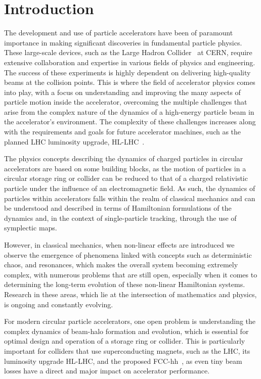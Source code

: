 


\chapter*{Introduction}

The development and use of particle accelerators have been of paramount importance in making significant discoveries in fundamental particle physics. These large-scale devices, such as the Large Hadron Collider~\cite{Bruning:782076} at CERN, require extensive collaboration and expertise in various fields of physics and engineering. The success of these experiments is highly dependent on delivering high-quality beams at the collision points. This is where the field of accelerator physics comes into play, with a focus on understanding and improving the many aspects of particle motion inside the accelerator, overcoming the multiple challenges that arise from the complex nature of the dynamics of a high-energy particle beam in the accelerator's environment. The complexity of these challenges increases along with the requirements and goals for future accelerator machines, such as the planned LHC luminosity upgrade, HL-LHC~\cite{BejarAlonso:2749422, Arduini_2016}.

The physics concepts describing the dynamics of charged particles in circular accelerators are based on some building blocks, as the motion of particles in a circular storage ring or collider can be reduced to that of a charged relativistic particle under the influence of an electromagnetic field. As such, the dynamics of particles within accelerators falls within the realm of classical mechanics and can be understood and described in terms of Hamiltonian formulations of the dynamics and, in the context of single-particle tracking, through the use of symplectic maps.

However, in classical mechanics, when non-linear effects are introduced we observe the emergence of phenomena linked with  concepts such as deterministic chaos, and resonances, which makes the overall system becoming extremely complex, with numerous problems that are still open, especially when it comes to determining the long-term evolution of these non-linear Hamiltonian systems. Research in these areas, which lie at the intersection of mathematics and physics, is ongoing and constantly evolving.

For modern circular particle accelerators, one open problem is understanding the complex dynamics of beam-halo formation and evolution, which is essential for optimal design and operation of a storage ring or collider. This is particularly important for colliders that use superconducting magnets, such as the LHC, its luminosity upgrade HL-LHC, and the proposed FCC-hh~\cite{Benedikt:2651300}, as even tiny beam losses have a direct and major impact on accelerator performance.

